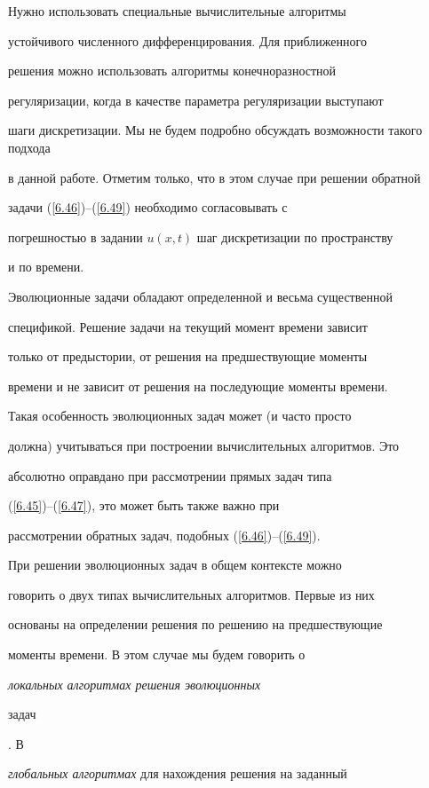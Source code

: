 Нужно использовать специальные вычислительные алгоритмы


устойчивого численного дифференцирования. Для приближенного


решения можно использовать алгоритмы конечноразностной


регуляризации, когда в качестве параметра регуляризации выступают


шаги дискретизации. Мы не будем  подробно обсуждать возможности такого подхода


в данной работе. Отметим только, что в этом случае при решении обратной


задачи (\ref{6.46})--(\ref{6.49}) необходимо согласовывать с


погрешностью в задании  $u(x,t)$ шаг дискретизации по пространству


и по времени.





Эволюционные  задачи обладают определенной и весьма существенной


спецификой. Решение задачи на текущий момент времени зависит


только от предыстории, от решения на предшествующие моменты


времени и не зависит от решения на последующие моменты времени.


Такая особенность эволюционных задач может (и часто просто


должна) учитываться при построении вычислительных алгоритмов. Это


абсолютно оправдано при рассмотрении прямых задач типа


(\ref{6.45})--(\ref{6.47}), это может быть также важно при


рассмотрении обратных задач, подобных (\ref{6.46})--(\ref{6.49}).





При решении эволюционных задач в  общем контексте можно


говорить о двух типах вычислительных алгоритмов. Первые из них


основаны на определении решения по решению на предшествующие


моменты времени. В этом случае мы будем говорить о


{\it локальных алгоритмах решения эволюционных


задач}. В


{\it глобальных алгоритмах} для нахождения решения на заданный


